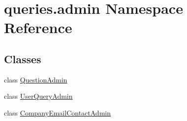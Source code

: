 \hypertarget{namespacequeries_1_1admin}{\section{queries.\-admin Namespace Reference}
\label{namespacequeries_1_1admin}
}
\subsection*{Classes}
\begin{DoxyCompactItemize}
\item 
class \hyperlink{classqueries_1_1admin_1_1_question_admin}{Question\-Admin}
\item 
class \hyperlink{classqueries_1_1admin_1_1_user_query_admin}{User\-Query\-Admin}
\item 
class \hyperlink{classqueries_1_1admin_1_1_company_email_contact_admin}{Company\-Email\-Contact\-Admin}
\end{DoxyCompactItemize}
